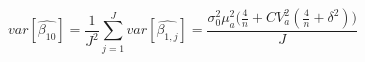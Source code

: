 \begin{equation}
\label{avgvar}
var[\hat{\beta_{10}}] = \frac{1}{J^2}\sum\limits_{j=1}^{J}{var[\hat{\beta_{1,j}}]} = \frac{\sigma_0^2\mu_a^2\Big(\frac{4}{n} + CV_{a}^2(\frac{4}{n} + \delta^2)\Big)}{J}
\end{equation}